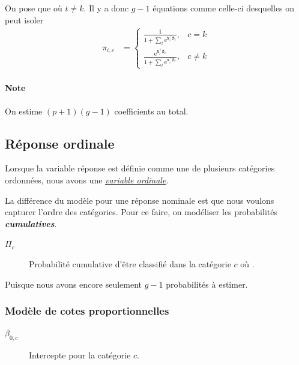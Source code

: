\documentclass[french]{article}
\begin{document}
\begin{multicols*}{2}
On pose que  où $t \neq k$. Il y a donc $g - 1$ équations comme celle-ci desquelles on peut isoler  
\begin{align*}
	\pi_{i, c}
	&=	\begin{cases}
		\frac{1}{1 + \sum_{t} \textrm{e}^{\bm{x}^{\top}_{i}\bm{\beta}_{t}}},	&	c = k	\\
		\frac{\textrm{e}^{\bm{x}^{\top}_{i}\bm{\beta}_{c}}}{1 + \sum_{t} \textrm{e}^{\bm{x}^{\top}_{i}\bm{\beta}_{t}}},	&	c \neq k
		\end{cases}
\end{align*}

\paragraph{Note}	On estime $(p + 1)(g - 1)$ coefficients au total.


\columnbreak
\subsection{Réponse ordinale}
\begin{rappel_enhanced}[Contexte]
Lorsque la variable réponse est définie comme une de plusieurs catégories ordonnées, nous avons une \textit{\color{bleudefrance}\underline{\hyperlink{ordinalVariable}{\color{bleudefrance} variable ordinale}}}. 

\bigskip

La différence du modèle pour une réponse nominale est que nous voulons capturer l'ordre des catégories. Pour ce faire, on modéliser les probabilités \textbf{\textit{cumulatives}}.
\end{rappel_enhanced}

\begin{distributions}[Notation]
\begin{description}
	\item[$\Pi_{c}$]	Probabilité cumulative d'être classifié dans la catégorie $c$ où .
\end{description}
\end{distributions}

Puisque  nous avons encore seulement $g - 1$ probabilités à estimer.


\subsubsection{Modèle de cotes proportionnelles}
\begin{distributions}[Notation]
\begin{description}
	\item[$\beta_{0, c}$]	Intercepte pour la catégorie $c$.
\end{description}
\end{distributions}



\end{multicols*}
\end{document}
